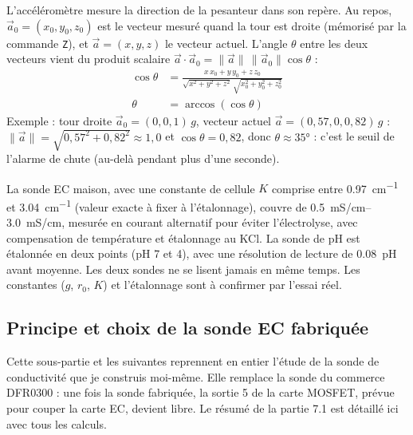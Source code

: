 \begin{demonstration}
L'accéléromètre mesure la direction de la pesanteur dans son repère. Au repos, $\vec a_0 = (x_0, y_0, z_0)$ est le vecteur mesuré quand la tour est droite (mémorisé par la commande \texttt{Z}), et $\vec a = (x, y, z)$ le vecteur actuel. L'angle $\theta$ entre les deux vecteurs vient du produit scalaire $\vec a \cdot \vec a_0 = \|\vec a\|\,\|\vec a_0\|\cos\theta$ :
\begin{align*}
\cos\theta &= \frac{x\,x_0 + y\,y_0 + z\,z_0}{\sqrt{x^2+y^2+z^2}\,\sqrt{x_0^2+y_0^2+z_0^2}}\\
\theta &= \arccos(\cos\theta)
\end{align*}
Exemple : tour droite $\vec a_0 = (0, 0, 1)\,g$, vecteur actuel $\vec a = (0{,}57, 0, 0{,}82)\,g$ : $\|\vec a\| = \sqrt{0{,}57^2 + 0{,}82^2} \approx 1{,}0$ et $\cos\theta = 0{,}82$, donc $\theta \approx \ang{35}$ : c'est le seuil de l'alarme de chute (au-delà pendant plus d'une seconde).
\end{demonstration}

\begin{aretenir}
La sonde EC maison, avec une constante de cellule $K$ comprise entre \qty{0,97}{cm^{-1}} et \qty{3,04}{cm^{-1}} (valeur exacte à fixer à l'étalonnage), couvre de \qtyrange{0,5}{3,0}{mS/cm}, mesurée en courant alternatif pour éviter l'électrolyse, avec compensation de température et étalonnage au KCl. La sonde de pH est étalonnée en deux points (pH 7 et 4), avec une résolution de lecture de \qty{0,08}{pH} avant moyenne. Les deux sondes ne se lisent jamais en même temps. Les constantes ($g$, $r_0$, $K$) et l'étalonnage sont à confirmer par l'essai réel.
\end{aretenir}

\subsection{Principe et choix de la sonde EC fabriquée}

Cette sous-partie et les suivantes reprennent en entier l'étude de la sonde de conductivité que je construis moi-même. Elle remplace la sonde du commerce DFR0300 : une fois la sonde fabriquée, la sortie 5 de la carte MOSFET, prévue pour couper la carte EC, devient libre. Le résumé de la partie 7.1 est détaillé ici avec tous les calculs.

